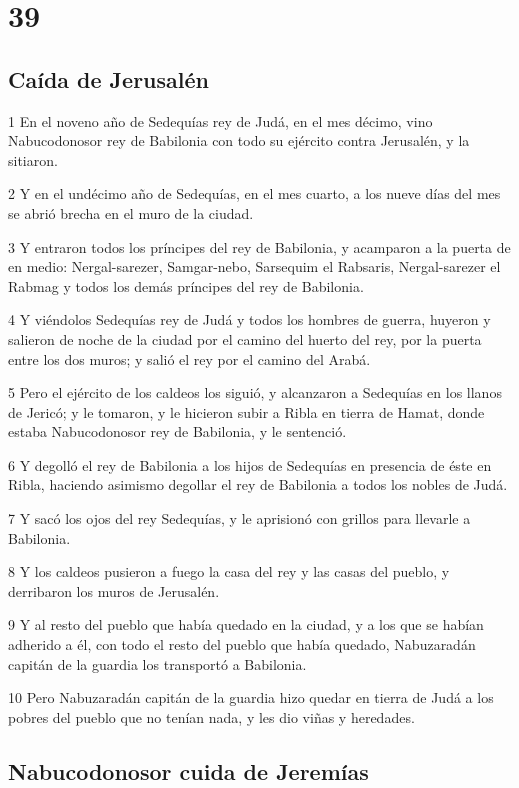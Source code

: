 \chapter{39}

\section*{Caída de Jerusalén}

\par 1 En el noveno año de Sedequías rey de Judá, en el mes décimo, vino Nabucodonosor rey de Babilonia con todo su ejército contra Jerusalén, y la sitiaron.
\par 2 Y en el undécimo año de Sedequías, en el mes cuarto, a los nueve días del mes se abrió brecha en el muro de la ciudad.
\par 3 Y entraron todos los príncipes del rey de Babilonia, y acamparon a la puerta de en medio: Nergal-sarezer, Samgar-nebo, Sarsequim el Rabsaris, Nergal-sarezer el Rabmag y todos los demás príncipes del rey de Babilonia.
\par 4 Y viéndolos Sedequías rey de Judá y todos los hombres de guerra, huyeron y salieron de noche de la ciudad por el camino del huerto del rey, por la puerta entre los dos muros; y salió el rey por el camino del Arabá.
\par 5 Pero el ejército de los caldeos los siguió, y alcanzaron a Sedequías en los llanos de Jericó; y le tomaron, y le hicieron subir a Ribla en tierra de Hamat, donde estaba Nabucodonosor rey de Babilonia, y le sentenció.
\par 6 Y degolló el rey de Babilonia a los hijos de Sedequías en presencia de éste en Ribla, haciendo asimismo degollar el rey de Babilonia a todos los nobles de Judá.
\par 7 Y sacó los ojos del rey Sedequías, y le aprisionó con grillos para llevarle a Babilonia.
\par 8 Y los caldeos pusieron a fuego la casa del rey y las casas del pueblo, y derribaron los muros de Jerusalén.
\par 9 Y al resto del pueblo que había quedado en la ciudad, y a los que se habían adherido a él, con todo el resto del pueblo que había quedado, Nabuzaradán capitán de la guardia los transportó a Babilonia.
\par 10 Pero Nabuzaradán capitán de la guardia hizo quedar en tierra de Judá a los pobres del pueblo que no tenían nada, y les dio viñas y heredades.

\section*{Nabucodonosor cuida de Jeremías}

